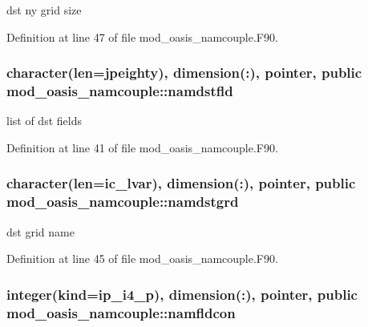 dst ny grid size 



Definition at line 47 of file mod\+\_\+oasis\+\_\+namcouple.\+F90.

\hypertarget{classmod__oasis__namcouple_ac4cfec209e4169b6098f9a8b9be1ffb1}{
\subsubsection[{namdstfld}]{\setlength{\rightskip}{0pt plus 5cm}character(len={\bf jpeighty}), dimension(\+:), pointer, public mod\+\_\+oasis\+\_\+namcouple\+::namdstfld}}\label{classmod__oasis__namcouple_ac4cfec209e4169b6098f9a8b9be1ffb1}


list of dst fields 



Definition at line 41 of file mod\+\_\+oasis\+\_\+namcouple.\+F90.

\hypertarget{classmod__oasis__namcouple_a7a2ed64b0670db38d2287f5d452060e4}{
\subsubsection[{namdstgrd}]{\setlength{\rightskip}{0pt plus 5cm}character(len=ic\+\_\+lvar), dimension(\+:), pointer, public mod\+\_\+oasis\+\_\+namcouple\+::namdstgrd}}\label{classmod__oasis__namcouple_a7a2ed64b0670db38d2287f5d452060e4}


dst grid name 



Definition at line 45 of file mod\+\_\+oasis\+\_\+namcouple.\+F90.

\hypertarget{classmod__oasis__namcouple_a96aa6a31ef021468f807819a84b327c3}{
\subsubsection[{namfldcon}]{\setlength{\rightskip}{0pt plus 5cm}integer(kind=ip\+\_\+i4\+\_\+p), dimension(\+:), pointer, public mod\+\_\+oasis\+\_\+namcouple\+::namfldcon}}\label{classmod__oasis__namcouple_a96aa6a31ef021468f807819a84b327c3}


